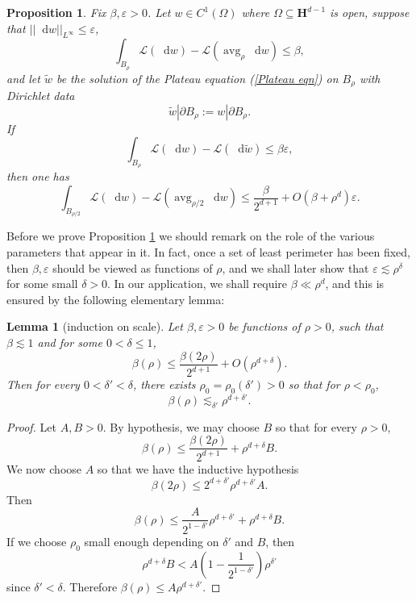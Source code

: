 \documentclass[reqno,12pt,letterpaper]{amsart}
\newcommand{\Hyp}{\mathbf H}
\DeclareMathOperator{\avg}{avg}
\newcommand*\dif{\mathop{}\!\mathrm{d}}
\newcommand{\Lagrange}{\mathscr L}
\newtheorem{lemma}[theorem]{Lemma}
\newtheorem{proposition}[theorem]{Proposition}
\theoremstyle{definition}
\numberwithin{equation}{section}
\begin{document}
\begin{proposition}\label{dGL Laplace}
Fix $\beta, \varepsilon > 0$.
Let $w \in C^1(\Omega)$ where $\Omega \subseteq \Hyp^{d - 1}$ is open, suppose that $||\dif w||_{L^\infty} \leq \varepsilon$,
\begin{equation}\label{dGL Laplace 1}
\int_{B_\rho} \Lagrange(\dif w) - \Lagrange(\avg_\rho \dif w) \leq \beta,
\end{equation}
and let $\tilde w$ be the solution of the Plateau equation (\ref{Plateau eqn}) on $B_\rho$ with Dirichlet data
$$\tilde w|\partial B_\rho := w|\partial B_\rho.$$
If
\begin{equation}\label{dGL Laplace 2}
\int_{B_\rho} \Lagrange(\dif w) - \Lagrange(\dif \tilde w) \leq \beta\varepsilon,
\end{equation}
then one has
\begin{equation}\label{dGL Laplace concl}
\int_{B_{\rho/2}} \Lagrange(\dif w) - \Lagrange(\avg_{\rho/2} \dif w) \leq \frac{\beta}{2^{d + 1}} + O(\beta + \rho^d)\varepsilon.
\end{equation}
\end{proposition}

Before we prove Proposition \ref{dGL Laplace} we should remark on the role of the various parameters that appear in it.
In fact, once a set of least perimeter has been fixed, then $\beta,\varepsilon$ should be viewed as functions of $\rho$, and we shall later show that $\varepsilon \lesssim \rho^\delta$ for some small $\delta > 0$.
In our application, we shall require $\beta \ll \rho^d$, and this is ensured by the following elementary lemma:

\begin{lemma}[induction on scale]\label{effectiveness of dGL Laplace}
Let $\beta, \varepsilon > 0$ be functions of $\rho > 0$, such that $\beta \lesssim 1$ and for some $0 < \delta \leq 1$,
$$\beta(\rho) \leq \frac{\beta(2\rho)}{2^{d + 1}} + O(\rho^{d + \delta}).$$
Then for every $0 < \delta' < \delta$, there exists $\rho_0 = \rho_0(\delta') > 0$ so that for $\rho < \rho_0$,
$$\beta(\rho) \lesssim_{\delta'} \rho^{d + \delta'}.$$
\end{lemma}
\begin{proof}
Let $A, B > 0$. By hypothesis, we may choose $B$ so that for every $\rho > 0$,
$$\beta(\rho) \leq \frac{\beta(2\rho)}{2^{d + 1}} + \rho^{d + \delta}B.$$
We now choose $A$ so that we have the inductive hypothesis
$$\beta(2\rho) \leq 2^{d + \delta'} \rho^{d + \delta'} A.$$
Then
$$\beta(\rho) \leq \frac{A}{2^{1 - \delta'}} \rho^{d + \delta'} + \rho^{d + \delta}B.$$
If we choose $\rho_0$ small enough depending on $\delta'$ and $B$, then
$$\rho^{d + \delta}B < A\left(1 - \frac{1}{2^{1 - \delta'}}\right) \rho^{\delta'}$$
since $\delta' < \delta$.
Therefore $\beta(\rho) \leq A\rho^{d + \delta'}$.
\end{proof}
\end{document}

